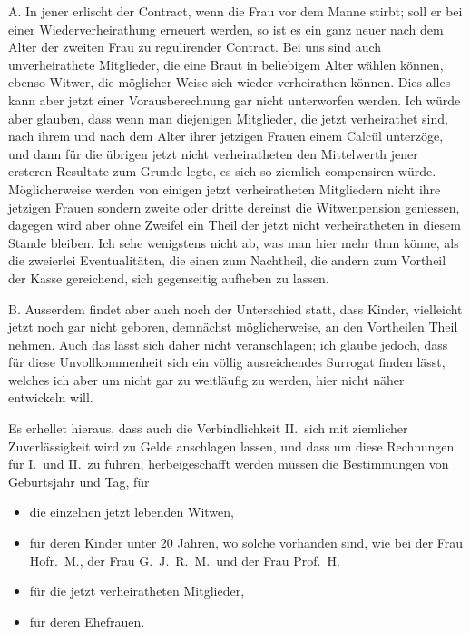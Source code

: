 \documentclass[12pt,a4paper]{article}
\begin{document}
A. In jener erlischt der Contract, wenn die Frau vor dem Manne stirbt; soll er bei einer Wiederverheirathung erneuert werden, so ist es ein ganz neuer nach dem Alter der zweiten Frau zu regulirender Contract. Bei uns sind auch unverheirathete Mitglieder, die eine Braut in beliebigem Alter w\"ahlen k\"onnen, ebenso Witwer, die m\"oglicher Weise sich wieder verheirathen k\"onnen. Dies alles kann aber jetzt einer Vorausberechnung gar nicht unterworfen werden. Ich w\"urde aber glauben, dass wenn man diejenigen Mitglieder, die jetzt verheirathet sind, nach ihrem und nach dem Alter ihrer jetzigen Frauen einem Calc\"ul unterz\"oge, und dann f\"ur die \"ubrigen jetzt nicht verheiratheten den Mittelwerth jener ersteren Resultate zum Grunde legte, es sich so ziemlich compensiren w\"urde. M\"oglicherweise werden von einigen jetzt verheiratheten Mitgliedern nicht ihre jetzigen Frauen sondern zweite oder dritte dereinst die Witwenpension geniessen, dagegen wird aber ohne Zweifel ein Theil der jetzt nicht verheiratheten in diesem Stande bleiben. Ich sehe wenigstens nicht ab, was man hier mehr thun k\"onne, als die zweierlei Eventualit\"aten, die einen zum Nachtheil, die andern zum Vortheil der Kasse gereichend, sich gegenseitig aufheben zu lassen.

B. Ausserdem findet aber auch noch der Unterschied statt, dass Kinder, vielleicht jetzt noch gar nicht geboren, demn\"achst m\"oglicherweise, an den Vortheilen Theil nehmen. Auch das l\"asst sich daher nicht veranschlagen; ich glaube jedoch, dass f\"ur diese Unvollkommenheit sich ein v\"ollig ausreichendes Surrogat finden l\"asst, welches ich aber um nicht gar zu weitl\"aufig zu werden, hier nicht n\"aher entwickeln will.

Es erhellet hieraus, dass auch die Verbindlichkeit II.\ sich mit ziemlicher Zuverl\"assigkeit wird zu Gelde anschlagen lassen, und dass um diese Rechnungen f\"ur I.\ und II.\ zu f\"uhren, herbeigeschafft werden m\"ussen die Bestimmungen von Geburtsjahr und Tag, f\"ur
\begin{itemize}
\item[] die einzelnen jetzt lebenden Witwen,
\item[] f\"ur deren Kinder unter 20 Jahren, wo solche vorhanden sind, wie bei der Frau Hofr.\ M., der Frau G.\ J.\ R.\ M.\ und der Frau Prof.\ H.
\item[] f\"ur die jetzt verheiratheten Mitglieder,
\item[] f\"ur deren Ehefrauen.
\end{itemize}
\end{document}
